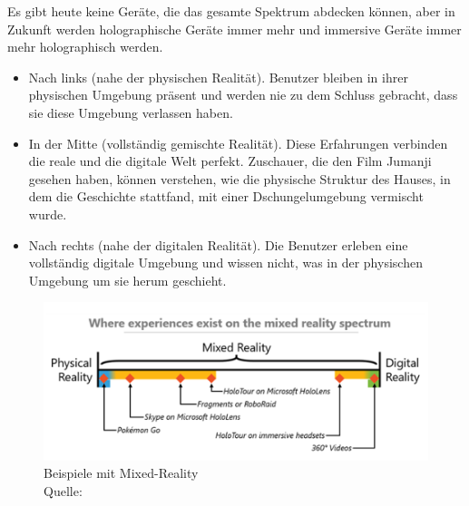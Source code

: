 Es gibt heute keine Geräte, die das gesamte Spektrum abdecken können, aber in Zukunft werden holographische Geräte immer mehr und immersive Geräte immer mehr holographisch werden.
\begin{itemize}
	\item Nach links (nahe der physischen Realität). Benutzer bleiben in ihrer physischen Umgebung präsent und werden nie zu dem Schluss gebracht, dass sie diese Umgebung verlassen haben.
	\item In der Mitte (vollständig gemischte Realität). Diese Erfahrungen verbinden die reale und die digitale Welt perfekt. Zuschauer, die den Film Jumanji gesehen haben, können verstehen, wie die physische Struktur des Hauses, in dem die Geschichte stattfand, mit einer Dschungelumgebung vermischt wurde.
	\item Nach rechts (nahe der digitalen Realität). Die Benutzer erleben eine vollständig digitale Umgebung und wissen nicht, was in der physischen Umgebung um sie herum geschieht.
\end{itemize}

\begin{figure}[ht]
	\centering
	\includegraphics[width=\textwidth,height=\textheight,keepaspectratio]{images/BeispielemitMixedReality.png}
	\caption{Beispiele mit Mixed-Reality \\ Quelle: \cite[vgl.][]{BrandonBray}}
	\label{Mixed-Reality1}
\end{figure}

